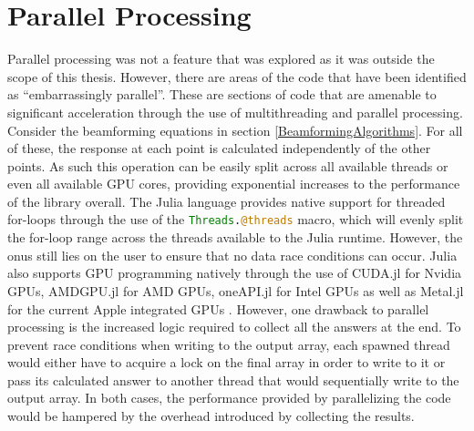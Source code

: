 \section{Parallel Processing}
Parallel processing was not a feature that was explored as it was outside the scope of this thesis. However, there are
areas of the code that have been identified as ``embarrassingly parallel''. These are sections of code that are amenable
to significant acceleration through the use of multithreading and parallel processing. Consider the beamforming equations
in section \ref{BeamformingAlgorithms}. For all of these, the response at each point is calculated
independently of the other points. As such this operation can be easily split across all available threads or even
all available GPU cores, providing exponential increases to the performance of the library overall. The Julia language
provides native support for threaded for-loops through the use of the \lstinline[language=Julia]{Threads.@threads}
macro, which will evenly split the for-loop range across the threads available to the Julia runtime. However, the onus
still lies on the user to ensure that no data race conditions can occur. Julia also supports GPU programming natively
through the use of CUDA.jl for Nvidia GPUs, AMDGPU.jl for AMD GPUs, oneAPI.jl for Intel GPUs as well as Metal.jl for the
current Apple integrated GPUs \cite{JuliaGPU}. However, one drawback to parallel processing is the increased logic
required to collect all the answers at the end. To prevent race conditions when writing to the output array, each
spawned thread would either have to acquire a lock on the final array in order to write to it or pass its calculated
answer to another thread that would sequentially write to the output array. In both cases, the performance provided by
parallelizing the code would be hampered by the overhead introduced by collecting the results. 